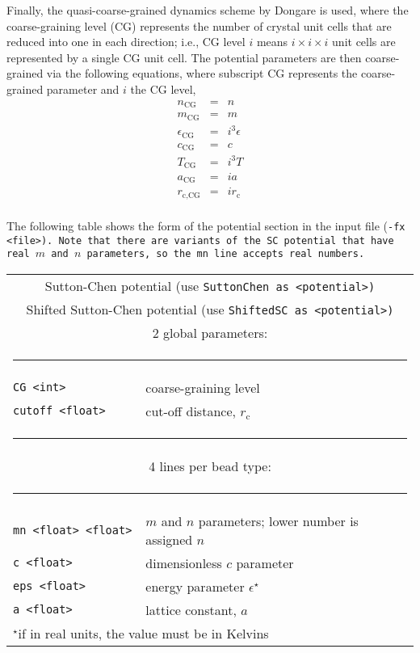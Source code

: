 Finally, the quasi-coarse-grained dynamics scheme by Dongare\cite{dongare2014}
is used, where the coarse-graining level (CG) represents the number of crystal
unit cells that are reduced into one in each direction; i.e., CG level $i$ means
$i\times i\times i$ unit cells are represented by a single CG unit cell. The
potential parameters are then coarse-grained via the following equations, where
subscript CG represents the coarse-grained parameter and $i$ the CG level,
\begin{equation}
  \begin{array}{rcl}
    n_\text{CG}&\!\!\!=\!\!\!&n\\
    m_\text{CG}&\!\!\!=\!\!\!&m\\
    \epsilon_\text{CG}&\!\!\!=\!\!\!&i^3\epsilon\\
    c_\text{CG}&\!\!\!=\!\!\!&c\\
    T_\text{CG}&\!\!\!=\!\!\!&i^3T\\
    a_\text{CG}&\!\!\!=\!\!\!&ia\\
    r_\text{c,CG}&\!\!\!=\!\!\!&ir_\text{c}\\
  \end{array}
\end{equation}

The following table shows the form of the potential section in the input file
(\tt{-fx <file>}). Note that there are variants of the SC potential that have
real $m$ and $n$ parameters, so the \tt{mn} line accepts real numbers.
\begin{longtable}{ll}
  \toprule
  \multicolumn{2}{c}{Sutton-Chen potential (use \tt{SuttonChen} as
    \tt{<potential>})}\\
  \multicolumn{2}{c}{Shifted Sutton-Chen potential (use \tt{ShiftedSC} as
    \tt{<potential>})}\\
  \midrule
  \multicolumn{2}{c}{2 global parameters:\vspace{-0.7em}}\\
  \multicolumn{2}{c}{\rule{0.3\textwidth}{0.5pt}}\\
  \tt{CG <int>}           & coarse-graining level\\
  \tt{cutoff <float>}     & cut-off distance, $r_\text{c}$\vspace{-0.7em}\\
  \multicolumn{2}{c}{\rule{0.3\textwidth}{0.5pt}}\\
  \multicolumn{2}{c}{4 lines per bead type:\vspace{-0.7em}}\\
  \multicolumn{2}{c}{\rule{0.3\textwidth}{0.5pt}}\\
  \tt{mn <float> <float>} & $m$ and $n$ parameters;
                            lower number is assigned $n$\\
  \tt{c <float>}          & dimensionless $c$ parameter\\
  \tt{eps <float>}        & energy parameter $\epsilon^\star$\\
  \tt{a <float>}          & lattice constant, $a$\\
  \bottomrule
  \multicolumn{2}{l}{$^\star$if in real units, the value must be in
  Kelvins}\\
\end{longtable}

\printbibliography[heading=subbibintoc]
